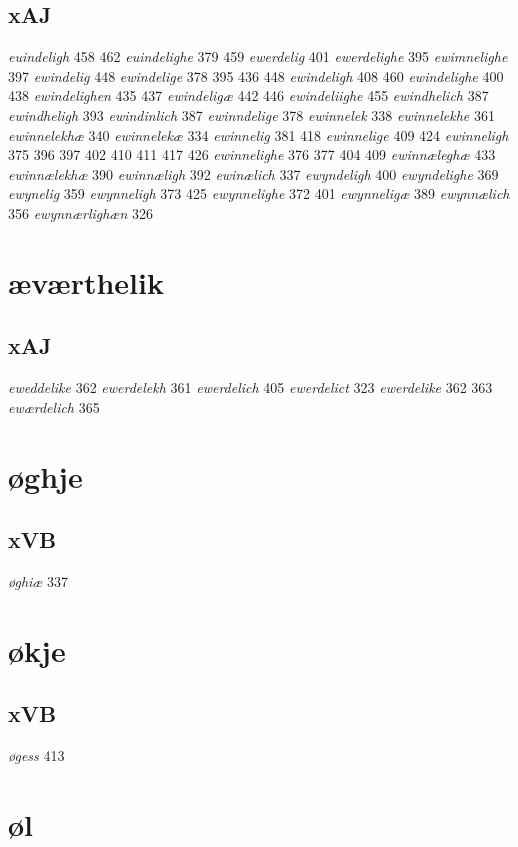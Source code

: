\documentclass[a4paper,twocolumn]{article}
\begin{document}
\subsection{xAJ}
\label{sec:org6776535}
\emph{euindeligh} 458 462 \emph{euindelighe} 379 459 \emph{ewerdelig} 401 \emph{ewerdelighe} 395 \emph{ewimnelighe} 397 \emph{ewindelig} 448 \emph{ewindelige} 378 395 436 448 \emph{ewindeligh} 408 460 \emph{ewindelighe} 400 438 \emph{ewindelighen} 435 437 \emph{ewindeligæ} 442 446 \emph{ewindeliighe} 455 \emph{ewindhelich} 387 \emph{ewindheligh} 393 \emph{ewindinlich} 387 \emph{ewinndelige} 378 \emph{ewinnelek} 338 \emph{ewinnelekhe} 361 \emph{ewinnelekhæ} 340 \emph{ewinnelekæ} 334 \emph{ewinnelig} 381 418 \emph{ewinnelige} 409 424 \emph{ewinneligh} 375 396 397 402 410 411 417 426 \emph{ewinnelighe} 376 377 404 409 \emph{ewinnæleghæ} 433 \emph{ewinnælekhæ} 390 \emph{ewinnæligh} 392 \emph{ewinælich} 337 \emph{ewyndeligh} 400 \emph{ewyndelighe} 369 \emph{ewynelig} 359 \emph{ewynneligh} 373 425 \emph{ewynnelighe} 372 401 \emph{ewynneligæ} 389 \emph{ewynnælich} 356 \emph{ewynnærlighæn} 326 
\section{æværthelik}
\label{sec:orgc9d3a55}
\subsection{xAJ}
\label{sec:org5ef8b0a}
\emph{eweddelike} 362 \emph{ewerdelekh} 361 \emph{ewerdelich} 405 \emph{ewerdelict} 323 \emph{ewerdelike} 362 363 \emph{ewærdelich} 365 
\section{øghje}
\label{sec:org612e242}
\subsection{xVB}
\label{sec:orga9811af}
\emph{øghiæ} 337 
\section{økje}
\label{sec:org2399e86}
\subsection{xVB}
\label{sec:org63cf97d}
\emph{øgess} 413 
\section{øl}
\label{sec:org7561379}
\end{document}

